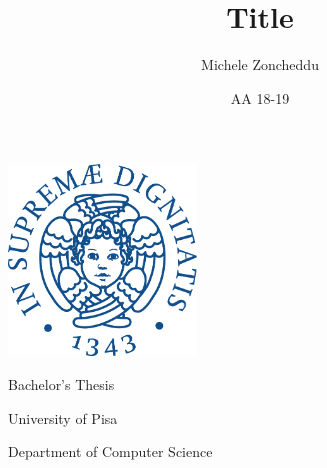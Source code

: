 \documentclass[a4paper, 12pt]{report}
\title{Title}
\author{Michele Zoncheddu}
\date{AA 18-19}
\begin{document}
	\begin{titlepage}
		\centering
		\includegraphics[height=12pc]{img/university_logos/cherubino_unipi.pdf}
		\bigbreak
		\bigbreak
		\bigbreak

		{\LARGE{\textbf{\@title}}}
		\bigbreak
		\bigbreak
		\medbreak

		{\large{Bachelor's Thesis}}
		\bigbreak
		\bigbreak
		\medbreak

		{\Large{\textbf{\@author}}}
		\bigbreak
		\bigbreak
		\medbreak

		{\Large{University of Pisa}}
		\bigbreak

		{\Large{Department of Computer Science}}
		\bigbreak

		{\Large{\@date}}
	\end{titlepage}


	\tableofcontents
	\clearpage

	\sloppy

	
	\clearpage
	
	\clearpage
	
	\clearpage
	
	\clearpage
	
	\clearpage
	

	\printbibliography[nottype=online, title=Bibliography]
	\printbibliography[type=online, title=Sitography]
\end{document}
